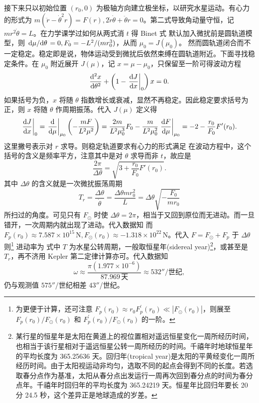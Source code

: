 接下来只以初始位置 $(r_0,0)$ 为极轴方向建立极坐标，以研究水星运动。有心力的形式为
$m(\ddot r-\dot\theta^2r)=F(r), 2\dot r\dot\theta+\ddot\theta r=0$。第二式导致角动量守恒，记 $mr^2{\dot \theta}=L$。在力学课学过如何从两式消 $t$ 得 Binet 式
默认加入微扰前是圆轨道模型，则 $\dv*{\mu}{\theta}=0,F_0=-{L^2}/{(mr_0^3)}$，从而 $\mu_0=J(\mu_0)$。
然而圆轨道闭合而不一定稳定。稳定即是说，物体运动受到微扰后依然束缚在圆轨道附近。下面寻找稳定条件。在 $\mu_0$ 附近展开 $J(\mu)$，记 $x=\mu-\mu_0$，只保留至一阶可得波动方程
\[
\dv[2]{x}{\theta}+\left(1-\eval{\dv{J}{x}}_{0}\right)x=0.
\]
如果括号为负，$x$ 将随 $\theta$ 指数增长或衰减，显然不再稳定。因此稳定要求括号为正，则 $x$ 将随 $\theta$ 作周期振荡。代入 $J(\mu)$ 定义得
\[\eval{\dv{J}{x}}_{0}=\eval{\dv{\mu}}_{\mu_0}\left(- \frac{mF}{L^2\mu^2} \right)= \frac{2m}{L^2\mu_0^3}F_0 - \frac{m}{L^2\mu_0^2} \eval{\dv{F}{\mu}}_{\mu_0} = -2 - \frac{r_0}{F_0} F'(r_0).\]
这里撇号表示对 $r$ 求导。则稳定轨道要求有心力的形式满足
在波动方程中，这个括号的含义是频率平方，注意其中是对 $\theta$ 求导而非 $t$，故应是
\[
\frac{2\pi}{\Delta\theta}=\sqrt{3+\frac{r_0}{F_0} F'(r_0)}.
\]
其中 $\Delta\theta$ 的含义就是一次微扰振荡周期
\[
T_r=\frac{\Delta\theta}{\dot\theta}=\frac{\Delta\theta mr_0^2}{L}=\Delta\theta\sqrt{-\frac{F_0}{mr_0}}
\]
所扫过的角度。可见只有 $F_\odot$ 时使 $\Delta\theta=2\pi$，相当于又回到原位而无进动。而一旦错开，一次周期内就出现了进动。代入数据知
而 $F_p(r_0)\approx 7.587 \times 10^{15}\,\mathrm{N}, F_\odot(r_0)\approx -1.318 \times 10^{22}\,\mathrm{N}$。代入 $F=F_{\odot}+F_p$ 于 $\Delta\theta$ 则\footnote{为更便于计算，还可注意 $F_p(r_0)\approx r_0 F_p^{\prime}(r_0) \ll |F_\odot(r_0)|$，则展至 $F_p(r_0) / F_\odot(r_0)$ 和 $F_p^{\prime}(r_0) / F_\odot(r_0)$ 的一阶。}
进动率为
式中 $T$ 为水星公转周期，一般取恒星年(sidereal year)\footnote{某行星的恒星年是太阳在黄道上的视位置相对遥远恒星变化一周所经历时间，也相当于该行星相对于遥远恒星公转一周所经历的时间。千禧年时地球恒星年的平均长度为 365.25636 天。回归年(tropical year)是太阳的平黄经变化一周所经历时间。由于太阳视运动非均匀，选取不同的起点会得到不同的长度。若选取春分点作为基准，太阳从春分点出发运行一周再次回到春分点的时间为春分点年。千禧年时回归年的平均长度为 365.24219 天。恒星年比回归年要长 20 分 24.5 秒，这个差异正是地球造成的岁差。}，或甚至是 $T_r$，再不济用 Kepler 第二定律计算亦可。代入数据知
\[\omega\approx\frac{\pi(1.977\times 10^{-6})}{87.969\,\text{天}}\approx 532''/\text{世纪},\]
仍与观测值 $575''$/世纪相差 $43''$/世纪。


